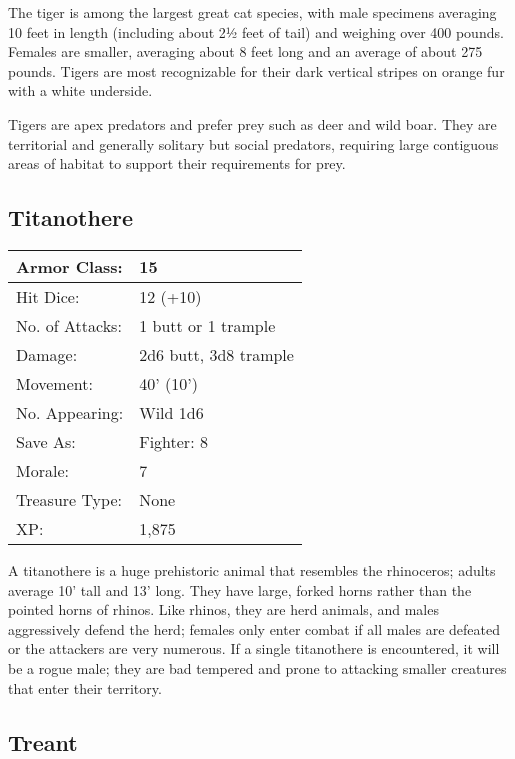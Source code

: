 \documentclass[a4paper,twoside,openany,10pt]{book}
\begin{document}
\begin{multicols}{2}
The tiger is among the largest great cat species, with male specimens averaging 10 feet in length (including about 2½ feet of tail) and weighing over 400 pounds. Females are smaller, averaging about 8 feet long and an average of about 275 pounds. Tigers are most recognizable for their dark vertical stripes on orange fur with a white underside. 

Tigers are apex predators and prefer prey such as deer and wild boar. They are territorial and generally solitary but social predators, requiring large contiguous areas of habitat to support their requirements for prey.

\subsection*{Titanothere}\label{titanothere}

\begin{tabularx}{0.50\textwidth}{@{}lX@{}}
Armor Class: & 15 \\\hline
Hit Dice: & 12 (+10) \\\hline
No. of Attacks: & 1 butt or 1 trample \\\hline
Damage: & 2d6 butt, 3d8 trample \\\hline
Movement: & 40' (10') \\\hline
No. Appearing: & Wild 1d6 \\\hline
Save As: & Fighter: 8 \\\hline
Morale: & 7 \\\hline
Treasure Type: & None \\\hline
XP: & 1,875 \\\hline
\end{tabularx}\medskip

A titanothere is a huge prehistoric animal that resembles the rhinoceros; adults average 10' tall and 13' long. They have large, forked horns rather than the pointed horns of rhinos. Like rhinos, they are herd animals, and males aggressively defend the herd; females only enter combat if all males are defeated or the attackers are very numerous. If a single titanothere is encountered, it will be a rogue male; they are bad tempered and prone to attacking smaller creatures that enter their territory.

\subsection*{Treant}\label{treant}


\end{multicols}
\end{document}
